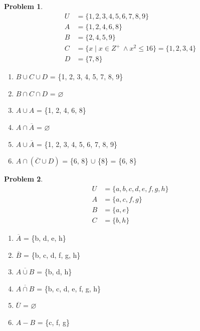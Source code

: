 \documentclass{article}
\theoremstyle{definition}
\newtheorem{problem}{Problem}[section]
\begin{document}
\begin{problem}
\[
    \begin{aligned}
        U &= \{1, 2, 3, 4, 5, 6, 7, 8, 9\}\\
        A &= \{1, 2, 4, 6, 8\}\\
        B &= \{2, 4, 5, 9\}\\
        C &= \{x \mid x \in Z^+\ \land x^2 \leq 16\}=\{1, 2, 3, 4\}\\
        D &= \{7, 8\}
    \end{aligned}
\]
    \begin{enumerate}[label=(\alph*)]
        Compute

        \item \(B \cup C \cup D\) = \{1, 2, 3, 4, 5, 7, 8, 9\}
        \item \(B \cap C \cap D\) = $\varnothing$
        \item \(A \cup A\) = \{1, 2, 4, 6, 8\}
        \item \(A \cap \overline{A}\) = $\varnothing$
        \item \(A \cup \overline{A}\) = \{1, 2, 3, 4, 5, 6, 7, 8, 9\}
        \item \(A \cap (\overline{C} \cup D)\) = \{6, 8\} $\cup$ \{8\} = \{6, 8\}

    \end{enumerate}
\end{problem}


\begin{problem}
\[
    \begin{aligned}
        U &= \{a, b, c, d, e, f, g, h\}\\
        A &= \{a, c, f, g\}\\
        B &= \{a, e\}\\
        C &= \{b, h\}
    \end{aligned}
\]
    \begin{enumerate}[label=(\alph*)]
        Compute

        \item \(\overline{A}\) = \{b, d, e, h\}
        \item \(\overline{B}\) = \{b, c, d, f, g, h\}
        \item \(\overline{A \cup B}\) = \{b, d, h\}
        \item \(\overline{A \cap B}\) = \{b, c, d, e, f, g, h\}
        \item \(\overline{U}\) = $\varnothing$
        \item \(A - B\) = \{c, f, g\}

    \end{enumerate}
\end{problem}
\end{document}
